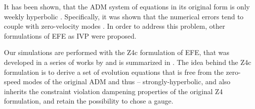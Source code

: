 It has been shown, that the \ac{ADM} system of equations in its original form 
is only weekly hyperbolic \citep{Baumgarte:2002jm}. 
Specifically, it was shown that 
the numerical errors tend to couple with zero-velocity modes \citep{Alcubierre:1999rt}. 
In order to address this problem, other formulations of \ac{EFE} as \ac{IVP} 
were proposed. 



Our simulations are performed with the Z4c formulation of \ac{EFE}, 
that was developed in a series of works by 
\citet{Bernuzzi:2009ex,Ruiz:2010qj,Weyhausen:2011cg,Cao:2011fu,Hilditch:2012fp} 
and is summarized in \citet{Hilditch:2012fp}. 
%
The idea behind the Z4c formulation is to derive a set of evolution equations that is 
free from the zero-speed modes of the original \ac{ADM} and thus -- 
strongly-hyperbolic, and also inherits the constraint violation dampening properties 
of the original Z4 formulation, and retain the possibility to chose a gauge.

